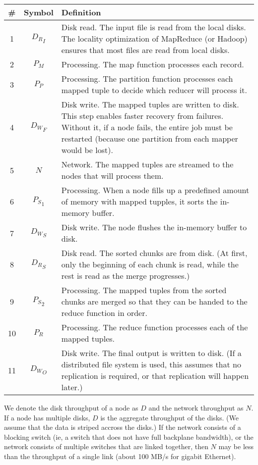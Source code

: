 \documentclass{acm_proc_article-sp}
\begin{document}
\begin{noop}\begin{tabular}{|c|c|p{2.25in}|} \hline
\#&Symbol&Definition\\ \hline
1 & ${D_{R}}_I$ & Disk read. The input file is read from the local disks. The locality optimization of MapReduce (or Hadoop) ensures that most files are read from local disks.\\ \hline
2 & $P_{M}$ & Processing. The map function processes each record. \\ \hline
3 & $P_{P}$ & Processing. The partition function processes each mapped tuple to decide which reducer will process it.\\ \hline
4 & ${D_{W}}_F$ & Disk write. The mapped tuples are written to disk. This step enables faster recovery from failures. Without it, if a node fails, the entire job must be restarted (because one partition from each mapper would be lost).\\ \hline
5 & $N$ & Network. The mapped tuples are streamed to the nodes that will process them.\\ \hline
6 & ${P_{S}}_1$ & Processing. When a node fills up a predefined amount of memory with mapped tupples, it sorts the in-memory buffer.\\ \hline
7 & ${D_{W}}_S$ & Disk write. The node flushes the in-memory buffer to disk.\\ \hline
8 & ${D_{R}}_S$ & Disk read. The sorted chunks are from disk. (At first, only the beginning of each chunk is read, while the rest is read as the merge progresses.)\\ \hline
9 & ${P_{S}}_2$ & Processing. The mapped tuples from the sorted chunks are merged so that they can be handed to the reduce function in order.\\ \hline
10 & $P_{R}$ & Processing. The reduce function processes each of the mapped tuples. \\ \hline
11 & ${D_{W}}_O$ & Disk write. The final output is written to disk. (If a distributed file system is used, this assumes that no replication is required, or that replication will happen later.)\\
\hline\end{tabular}\end{noop}

We denote the disk throughput of a node as $D$ and the network throughput as $N$. If a node has multiple disks, $D$ is the aggregate throughput of the disks. (We assume that the data is striped accross the disks.) If the network consists of a blocking switch (ie, a switch that does not have full backplane bandwidth), or the network consists of multiple switches that are linked together, then $N$ may be less than the throughput of a single link (about 100 MB/s for gigabit Ethernet).
\end{document}

